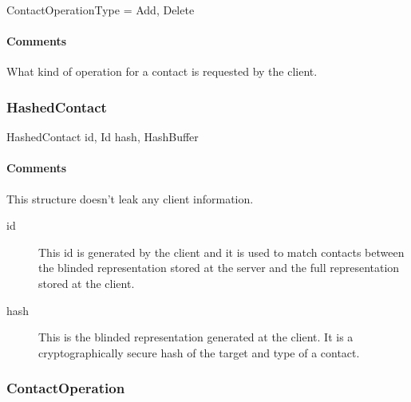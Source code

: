\documentclass[a4paper,10pt]{article}
\begin{document}
\begin{verbbox}
ContactOperationType = { Add, Delete }
\end{verbbox}
\begin{center}
\theverbbox
\end{center}

\begin{inparaitem}[ ]
 \item \infrastructure
\end{inparaitem}

\paragraph*{Comments}
What kind of operation for a contact is requested by the client.

\subsubsection{HashedContact}
\label{sec:structure:common:hashed_contact}

\begin{verbbox}
HashedContact
{
  id, Id
  hash, HashBuffer
}
\end{verbbox}
\begin{center}
\theverbbox
\end{center}

\begin{inparaitem}[ ]
 \item \infrastructure
\end{inparaitem}

\paragraph*{Comments}
This structure doesn't leak any client information.

\SpecialItem
\begin{description}
 \item[id] This id is generated by the client and it is used to match contacts between the blinded representation stored at the server and the full representation stored at the 
client.
 \item[hash] This is the blinded representation generated at the client. It is a cryptographically secure hash of the target and type of a contact.
\end{description}

\subsubsection{ContactOperation}
\end{document}
